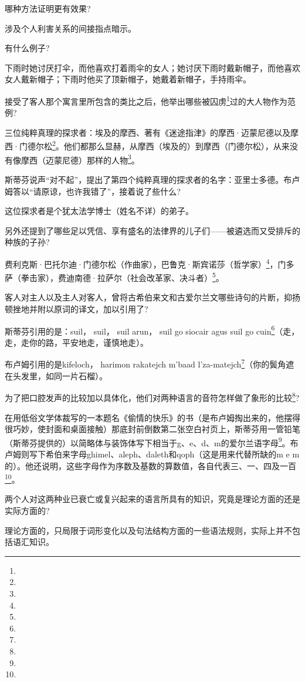 \par 哪种方法证明更有效果?
\par 涉及个人利害关系的间接指点暗示。
\par 有什么例子?
\par 下雨时她讨厌打伞，而他喜欢打着雨伞的女人；她讨厌下雨时戴新帽子，而他喜欢女人戴新帽子；下雨时他买了顶新帽子，她戴着新帽子，手持雨伞。
\par 接受了客人那个寓言里所包含的类比之后，他举出哪些被囚虏\footnote{}过的大人物作为范例?
\par 三位纯粹真理的探求者：埃及的摩西、著有《迷途指津》的摩西·迈蒙尼德以及摩西·门德尔松\footnote{}。他们都那么显赫，从摩西（埃及的）到摩西（门德尔松），从来没有像摩西（迈蒙尼德）那样的人物\footnote{}。
\par 斯蒂芬说声“对不起”，提出了第四个纯粹真理的探求者的名字：亚里士多德。布卢姆答以“请原谅，也许我错了”，接着说了些什么?
\par 这位探求者是个犹太法学博士（姓名不详）的弟子。
\par 另外还提到了哪些足以凭信、享有盛名的法律界的儿子们——被遴选而又受排斥的种族的子孙?
\par 费利克斯·巴托尔迪·门德尔松（作曲家），巴鲁克·斯宾诺莎（哲学家）\footnote{}，门多萨（拳击家），费迪南德·拉萨尔（社会改革家、决斗者）\footnote{}。
\par 客人对主人以及主人对客人，曾将古希伯来文和古爱尔兰文哪些诗句的片断，抑扬顿挫地并附以原词的译文，加以引用了?
\par 斯蒂芬引用的是：suil， suil， suil arun， suil go siocair agus suil go cuin\footnote{}（走，走，走你的路，平安地走，谨慎地走）。
\par 布卢姆引用的是kifeloch， harimon rakatejch m’baad l’za-matejch\footnote{}（你的鬓角遮在头发里，如同一片石榴）。
\par 为了把口腔发声的比较加以具体化，他们对两种语言的音符怎样做了象形的比较\footnote{}?
\par 在用低俗文学体裁写的一本题名《偷情的快乐》的书（是布卢姆掏出来的，他摆得很巧妙，使封面和桌面接触）那底封前倒数第二张空白衬页上，斯蒂芬用一管铅笔（斯蒂芬提供的）以简略体与装饰体写下相当于g、e、d、m的爱尔兰语字母\footnote{}。布卢姆则写下希伯来字母ghimel、aleph、daleth和qoph（这是用来代替所缺的m e m的）。他还说明，这些字母作为序数及基数的算数值，各自代表三、一、四及一百\footnote{}。
\par 两个人对这两种业已衰亡或复兴起来的语言所具有的知识，究竟是理论方面的还是实际方面的?
\par 理论方面的，只局限于词形变化以及句法结构方面的一些语法规则，实际上并不包括语汇知识。
